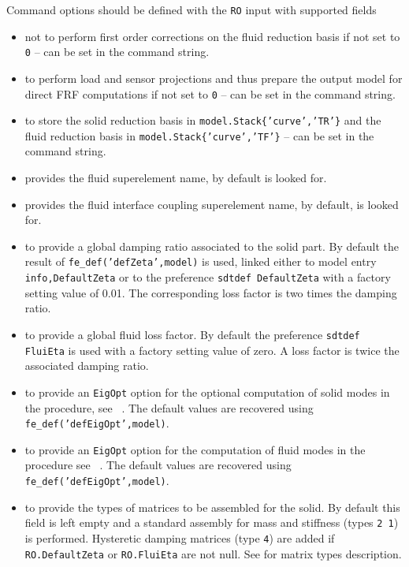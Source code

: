 \begin{SDT}
Command options should be defined with the {\tt RO} input with supported fields
\begin{itemize}
\item {} not to perform first order corrections on the fluid reduction basis if not set to {\tt 0} -- can be set in the command string.
\item {} to perform load and sensor projections and thus prepare the output model for direct FRF computations if not set to {\tt 0} -- can be set in the command string.
\item {} to store the solid reduction basis in {\tt model.Stack\{'curve','TR'\}} and the fluid reduction basis in {\tt model.Stack\{'curve','TF'\}} -- can be set in the command string.
\item {}  provides the fluid superelement name, by default  is looked for.
\item {} provides the fluid interface coupling superelement name, by default,  is looked for.
\item {} to provide a global damping ratio associated to the solid part. By default the result of {\tt fe\_def('defZeta',model)} is used, linked either to model entry {\tt info,DefaultZeta} or to the preference {\tt sdtdef DefaultZeta} with a factory setting value of 0.01. The corresponding loss factor is two times the damping ratio.
\item {} to provide a global fluid loss factor. By default the preference {\tt sdtdef FluiEta} is used with a factory setting value of zero. A loss factor is twice the associated damping ratio.
\item {} to provide an {\tt EigOpt} option for the optional computation of solid modes in the procedure, see \feeig\ . The default values are recovered using {\tt fe\_def('defEigOpt',model)}.
\item {} to provide an {\tt EigOpt} option for the computation of fluid modes in the procedure see \feeig\ . The default values are recovered using {\tt fe\_def('defEigOpt',model)}.
\item {} to provide the types of matrices to be assembled for the solid. By default this field is left empty and a standard assembly for mass and stiffness (types {\tt 2 1}) is performed. Hysteretic damping matrices (type {\tt 4}) are added if {\tt RO.DefaultZeta} or {\tt RO.FluiEta} are not null. See  for matrix types description.
\end{itemize}


\end{SDT}
